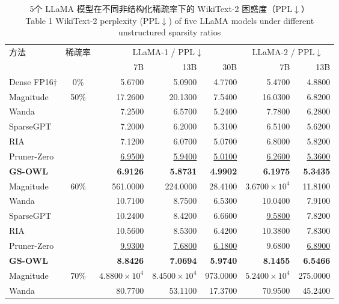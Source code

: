 \documentclass[UTF8,fontset=fandol]{ctexart}
\renewcommand{\arraystretch}{1.08}
\newcommand{\best}[1]{\textbf{#1}}
\newcommand{\second}[1]{\underline{#1}}
\begin{document}
\begin{table}[!htbp]
\centering
\caption{5个 LLaMA 模型在不同非结构化稀疏率下的 WikiText-2 困惑度（PPL$\downarrow$）\\
Table 1 WikiText-2 perplexity (PPL$\downarrow$) of five LLaMA models under different unstructured sparsity ratios}
\label{tab:ppl}
\scriptsize
\setlength{\tabcolsep}{4.2pt}
\renewcommand{\arraystretch}{0.96}
\begin{tabular*}{0.98\textwidth}{@{\extracolsep{\fill}}lcrrrrr@{}}
\toprule
\multirow{2}{*}{方法} & \multirow{2}{*}{稀疏率} &
\multicolumn{3}{c}{LLaMA-1 / PPL$\downarrow$} & \multicolumn{2}{c}{LLaMA-2 / PPL$\downarrow$} \\
\cmidrule(lr){3-5}\cmidrule(lr){6-7}
 & & 7B & 13B & 30B & 7B & 13B \\
\midrule
Dense FP16$\dagger$ & 0\% & 5.6700 & 5.0900 & 4.7700 & 5.4700 & 4.8800 \\
\midrule
Magnitude & \multirow{6}{*}{50\%} & 17.2600 & 20.1300 & 7.5400 & 16.0300 & 6.8200 \\
Wanda & & 7.2500 & 6.5700 & 5.2400 & 7.7800 & 6.2800 \\
SparseGPT & & 7.2000 & 6.2000 & 5.3100 & 6.5100 & 5.6200 \\
RIA & & 7.1200 & 6.0700 & 5.0700 & 6.8000 & 5.8200 \\
Pruner-Zero & & \second{6.9500} & \second{5.9400} & \second{5.0100} & \second{6.2600} & \second{5.3600} \\
\textbf{GS-OWL} & & \best{6.9126} & \best{5.8731} & \best{4.9902} & \best{6.1975} & \best{5.3435} \\
\midrule
Magnitude & \multirow{6}{*}{60\%} & 561.0000 & 224.0000 & 28.4100 & $3.6700\times10^4$ & 11.8100 \\
Wanda & & 10.7100 & 8.7500 & 6.5300 & 10.0400 & 7.9100 \\
SparseGPT & & 10.2400 & 8.4200 & 6.6600 & \second{9.5800} & 7.8200 \\
RIA & & 10.5600 & 8.5300 & 6.4200 & 10.3800 & 7.8300 \\
Pruner-Zero & & \second{9.9300} & \second{7.6800} & \second{6.1800} & 9.6800 & \second{6.8900} \\
\textbf{GS-OWL} & & \best{8.8426} & \best{7.0694} & \best{5.9740} & \best{8.1455} & \best{6.5466} \\
\midrule
  Magnitude & \multirow{11}{*}{70\%} & $4.8800\times10^4$ & $8.4500\times10^4$ & 973.0000 & $5.2400\times10^4$ & 275.0000 \\
  Wanda & & 80.7700 & 53.1100 & 17.3700 & 70.9500 & 45.2400 \\

\end{tabular*}
\end{table}
\end{document}
